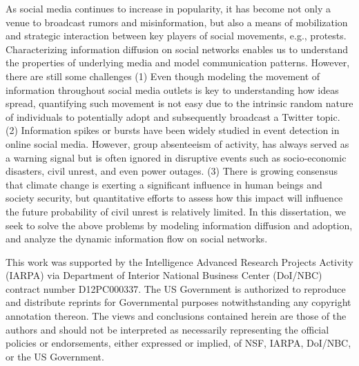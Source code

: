 \documentclass[12pt,dvips]{report}
\begin{document}
As social media continues to increase in popularity, it has become not only a venue to broadcast rumors and misinformation, but also a means of mobilization and strategic interaction between key players of social movements, e.g., protests. Characterizing information diffusion on social networks enables us to understand the properties of underlying media and model communication patterns. However, there are still some challenges (1) Even though modeling the movement of information throughout social media outlets is key to understanding how ideas spread, quantifying such movement is not easy due to the intrinsic random nature of individuals to potentially adopt and subsequently broadcast a Twitter topic. (2) Information spikes or bursts have been widely studied in event detection in online social media. However, group absenteeism of activity, has always served as a warning signal but is often ignored in disruptive events such as socio-economic disasters, civil unrest, and even power outages. (3) There is growing consensus that climate change is exerting a significant influence in human beings and society security, but quantitative efforts to assess how this impact will influence the future probability of civil unrest is relatively limited. In this dissertation, we seek to solve the above problems by modeling information diffusion and adoption, and analyze the dynamic information flow on social networks.



\vfill


This work was supported by the Intelligence Advanced Research Projects Activity
(IARPA) via Department of Interior National Business Center (DoI/NBC)
contract number D12PC000337. The US Government is authorized to
reproduce and distribute reprints for Governmental purposes
notwithstanding any copyright annotation thereon. The
views and conclusions contained herein are those of the authors and
should not be interpreted as necessarily representing the official
policies or endorsements, either expressed or implied, of NSF, IARPA,
DoI/NBC, or the US Government.

\pagebreak

\end{document}
